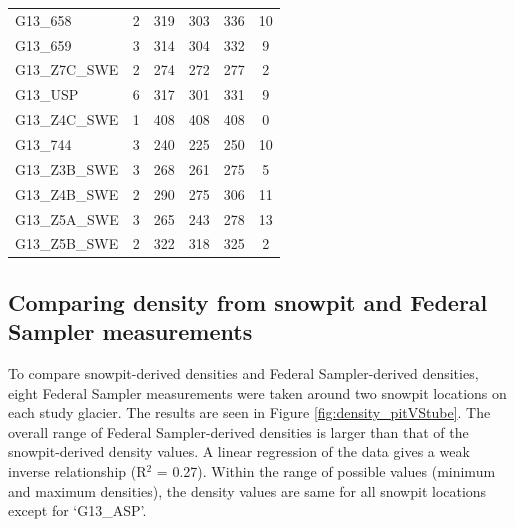 \documentclass[12pt]{article}
\begin{document}
\begin{table}[]
\begin{tabular}{lccccc}
G13\_658 & 2 & 319 & 303 & 336 & 10 \\
G13\_659 & 3 & 314 & 304 & 332 & 9 \\
G13\_Z7C\_SWE & 2 & 274 & 272 & 277 & 2 \\
G13\_USP & 6 & 317 & 301 & 331 & 9 \\
G13\_Z4C\_SWE & 1 & 408 & 408 & 408 & 0 \\
G13\_744 & 3 & 240 & 225 & 250 & 10 \\
G13\_Z3B\_SWE & 3 & 268 & 261 & 275 & 5 \\
G13\_Z4B\_SWE & 2 & 290 & 275 & 306 & 11 \\
G13\_Z5A\_SWE & 3 & 265 & 243 & 278 & 13 \\
G13\_Z5B\_SWE & 2 & 322 & 318 & 325 & 2
\end{tabular}
\end{table}

\subsection*{Comparing density from snowpit and Federal Sampler measurements}

To compare snowpit-derived densities and Federal Sampler-derived densities, eight Federal Sampler measurements were taken around two snowpit locations on each study glacier. The results are seen in Figure \ref{fig:density_pitVStube}. The overall range of Federal Sampler-derived densities is larger than that of the snowpit-derived density values. A linear regression of the data gives a weak inverse relationship (R$^2$ = 0.27). Within the range of possible values (minimum and maximum densities), the density values are same for all snowpit locations except for `G13\_ASP'.
\end{document}
